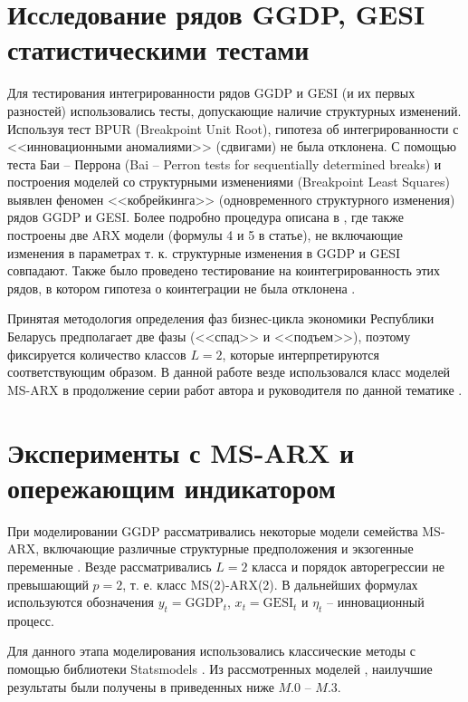 \documentclass[a4paper,14pt]{extreport}
\begin{document}
\section{Исследование рядов GGDP, GESI статистическими тестами}

\label{section:gdp_stattests}

Для тестирования интегрированности рядов GGDP и GESI (и их первых разностей) использовались тесты, допускающие наличие структурных изменений. Используя тест BPUR (Breakpoint Unit Root), гипотеза об интегрированности с <<инновационными аномалиями>> (сдвигами) не была отклонена. 
С помощью теста Баи – Перрона (Bai – Perron tests for sequentially determined breaks) и построения моделей со структурными изменениями (Breakpoint Least Squares) выявлен феномен <<кобрейкинга>> (одновременного структурного изменения) рядов GGDP и GESI. 
Более подробно процедура описана в \cite{mak_mal_bv_2020}, где также построены две ARX модели (формулы 4 и 5 в статье), не включающие изменения в параметрах т. к.  структурные изменения в GGDP и GESI совпадают. Также было проведено тестирование на коинтегрированность этих рядов, в котором гипотеза о коинтеграции не была отклонена \cite{mak_mal_bv_2020}. 

Принятая методология определения фаз бизнес-цикла экономики Республики Беларусь предполагает две фазы (<<спад>> и <<подъем>>), поэтому фиксируется количество классов $L=2$, которые интерпретируются соответствующим образом. В данной работе везде использовался класс моделей MS-ARX в продолжение серии работ автора и руководителя по данной тематике \cite{mak_mal_bv_2018,malVARforCycles}.


\section{Эксперименты с MS-ARX и опережающим индикатором}

При моделировании GGDP рассматривались некоторые модели семейства MS-ARX, включающие различные структурные предположения и экзогенные переменные \cite{mak_mal_bv_2020}. Везде рассматривались $L=2$ класса и порядок авторегрессии не превышающий $p=2$, т. е. класс MS(2)-ARX(2). В дальнейших формулах используются обозначения $y_t = \text{GGDP}_t$, \: $x_t = \text{GESI}_t$ и $\eta_t$ -- инновационный процесс.

Для данного этапа моделирования использовались классические методы с помощью библиотеки Statsmodels \cite{statsmodels}. Из рассмотренных моделей \cite{mak_mal_bv_2020}, наилучшие результаты были получены в приведенных ниже $M.0$ -- $M.3$.
\end{document}
